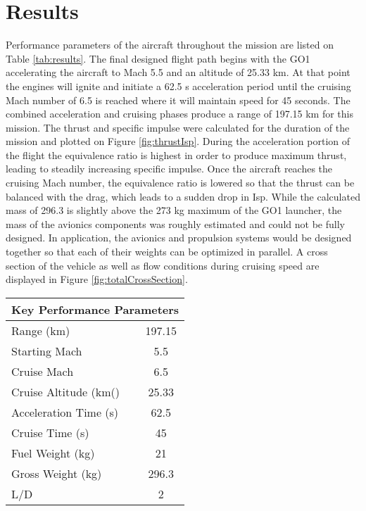 \section{Results}

 Performance parameters of the aircraft throughout the mission are listed on Table \ref{tab:results}. The final designed flight path begins with the GO1 accelerating the aircraft to Mach 5.5 and an altitude of 25.33 km. At that point the engines will ignite and initiate a 62.5 s acceleration period until the cruising Mach number of 6.5 is reached where it will maintain speed for 45 seconds. The combined acceleration and cruising phases produce a range of 197.15 km for this mission. The thrust and specific impulse were calculated for the duration of the mission and plotted on Figure \ref{fig:thrustIsp}. During the acceleration portion of the flight the equivalence ratio is highest in order to produce maximum thrust, leading to steadily increasing specific impulse. Once the aircraft reaches the cruising Mach number, the equivalence ratio is lowered so that the thrust can be balanced with the drag, which leads to a sudden drop in Isp. While the calculated mass of 296.3 is slightly above the 273 kg maximum of the GO1 launcher, the mass of the avionics components was roughly estimated and could not be fully designed. In application, the avionics and propulsion systems would be designed together so that each of their weights can be optimized in parallel. A cross section of the vehicle as well as flow conditions during cruising speed are displayed in Figure \ref{fig:totalCrossSection}.

\begin{center}
\begin{tabular}{l c}
\multicolumn{2}{c}{\textbf{Key Performance Parameters}} \\
\hline
Range (km) & 197.15 \\
Starting Mach & 5.5 \\
Cruise Mach & 6.5 \\
Cruise Altitude (km()& 25.33 \\
Acceleration Time (s) & 62.5 \\
Cruise Time (s) & 45 \\
Fuel Weight (kg) & 21 \\
Gross Weight (kg) & 296.3 \\
L/D & 2
\end{tabular}
\label{tab:results}
\end{center}


